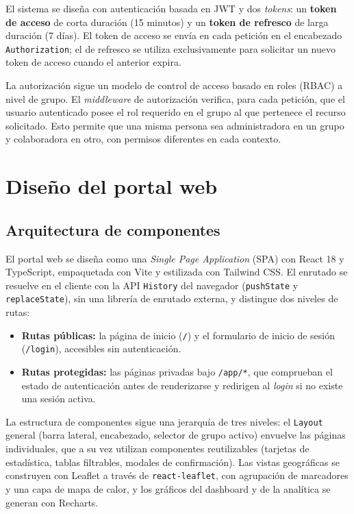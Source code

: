 El sistema se diseña con autenticación basada en JWT \cite{rfc7519jwt} y dos \textit{tokens}: un
\textbf{token de acceso} de corta duración (15 minutos) y un \textbf{token de refresco}
de larga duración (7 días). El token de acceso se envía en cada petición en el encabezado
\texttt{Authorization}; el de refresco se utiliza exclusivamente para solicitar un nuevo
token de acceso cuando el anterior expira.

La autorización sigue un modelo de control de acceso basado en roles (RBAC)
\cite{nistRbac}
a nivel de grupo. El \textit{middleware} de autorización verifica, para cada petición,
que el usuario autenticado posee el rol requerido en el grupo al que pertenece el
recurso solicitado. Esto permite que una misma persona sea administradora en un grupo
y colaboradora en otro, con permisos diferentes en cada contexto.

\section{Diseño del portal web}

\subsection{Arquitectura de componentes}

El portal web se diseña como una \textit{Single Page Application} (SPA) con
React 18 y TypeScript, empaquetada con Vite y estilizada con Tailwind CSS. El
enrutado se resuelve en el cliente con la API \texttt{History} del navegador
(\texttt{pushState} y \texttt{replaceState}), sin una librería de enrutado externa, y
distingue dos niveles de rutas:

\begin{itemize}
  \item \textbf{Rutas públicas:} la página de inicio (\texttt{/}) y el formulario
    de inicio de sesión (\texttt{/login}), accesibles sin autenticación.
  \item \textbf{Rutas protegidas:} las páginas privadas bajo \texttt{/app/*}, que
    comprueban el estado de autenticación antes de renderizarse y redirigen al
    \textit{login} si no existe una sesión activa.
\end{itemize}

La estructura de componentes sigue una jerarquía de tres niveles: el \texttt{Layout}
general (barra lateral, encabezado, selector de grupo activo) envuelve las páginas
individuales, que a su vez utilizan componentes reutilizables (tarjetas de estadística,
tablas filtrables, modales de confirmación). Las vistas geográficas se construyen con
Leaflet a través de \texttt{react-leaflet}, con agrupación de marcadores y una capa de
mapa de calor, y los gráficos del dashboard y de la analítica se generan con Recharts.


